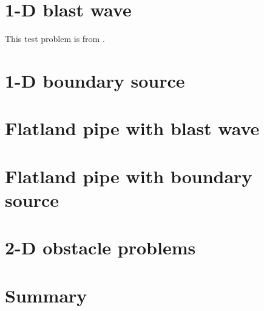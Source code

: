 \section{1-D blast wave}
This test problem is from \cite{Rau2005,Ols2007}.

\section{1-D boundary source}

\section{Flatland pipe with blast wave}

\section{Flatland pipe with boundary source}

\section{2-D obstacle problems}

\section{Summary}

